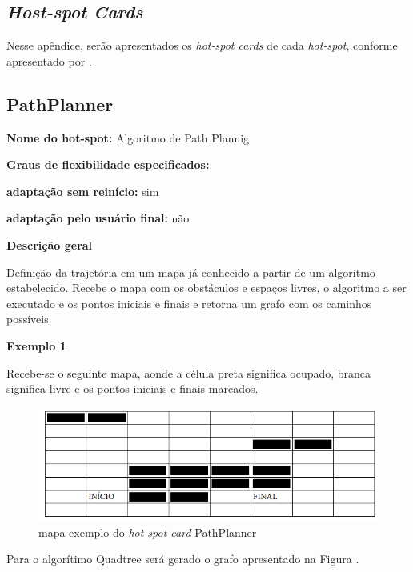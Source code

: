 \begin{apendicesenv}

\partapendices

\chapter{\textit{Host-spot Cards}}

Nesse apêndice, serão apresentados os \textit{hot-spot cards} de cada \textit{hot-spot}, conforme apresentado por \cite{Fayad1999}.

\section{PathPlanner}

{\large \textbf{Nome do hot-spot:}} Algoritmo de Path Plannig

{\large \textbf{Graus de flexibilidade especificados:}}

\textbf{adaptação sem reinício:} sim

\textbf{adaptação pelo usuário final:} não

{\large \textbf{Descrição geral}}

Definição da trajetória em um mapa já conhecido a partir de um algoritmo estabelecido. Recebe o mapa com os obstáculos e espaços livres, o algoritmo a ser executado e os pontos iniciais e finais e retorna um grafo com os caminhos possíveis

{\large \textbf{Exemplo 1}}

Recebe-se o seguinte mapa, aonde a célula preta significa ocupado, branca significa livre e os pontos iniciais e finais marcados.

\begin{figure}[H]
	\centering
	\label{figXX}
		\includegraphics[keepaspectratio=true,scale=0.7]{figuras/mapahotspot1.PNG}
	\caption{mapa exemplo do \textit{hot-spot card} PathPlanner}
\end{figure}

Para o algorítimo Quadtree será gerado o grafo apresentado na Figura \label{figXX1}.


\end{apendicesenv}

